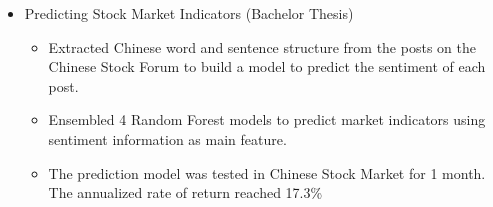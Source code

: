 \documentclass[line,margin]{res}
\begin{document}
\begin{resume}
        \vspace{1mm}
        \begin{itemize}
            \item Predicting Stock Market Indicators (Bachelor Thesis)
            \vspace{-2mm}
                \begin{itemize}
                \item Extracted Chinese word and sentence structure from the posts on the Chinese Stock Forum to build a model to predict the sentiment of each post.
                \vspace{-5.5mm}
                \item Ensembled 4 Random Forest models to predict market indicators using sentiment information as main feature.
                \vspace{-1.5mm}
                \item The prediction model was tested in Chinese Stock Market for 1 month. The annualized rate of return reached 17.3\%
            \end{itemize}
        \end{itemize}
\vspace{-4.5mm}


\end{resume}
\end{document}
